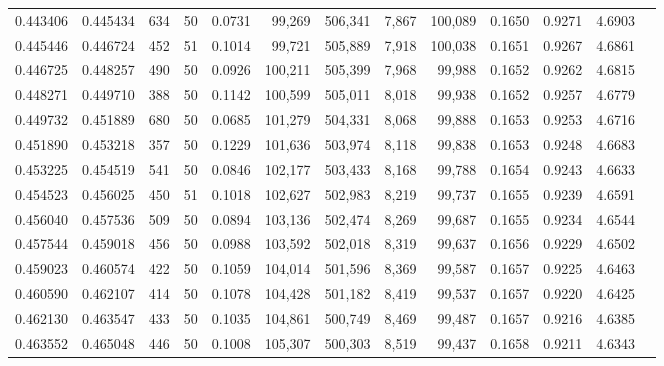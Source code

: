 \begin{tabular}{rrrrrrrrrrrrr}
0.443406 & 0.445434 &   634 &  50 &                                     0.0731 &  99,269 & 506,341 &   7,867 & 100,089 & 0.1650 & 0.9271 & 4.6903 \\
0.445446 & 0.446724 &   452 &  51 &                                     0.1014 &  99,721 & 505,889 &   7,918 & 100,038 & 0.1651 & 0.9267 & 4.6861 \\
0.446725 & 0.448257 &   490 &  50 &                                     0.0926 & 100,211 & 505,399 &   7,968 &  99,988 & 0.1652 & 0.9262 & 4.6815 \\
0.448271 & 0.449710 &   388 &  50 &                                     0.1142 & 100,599 & 505,011 &   8,018 &  99,938 & 0.1652 & 0.9257 & 4.6779 \\
0.449732 & 0.451889 &   680 &  50 &                                     0.0685 & 101,279 & 504,331 &   8,068 &  99,888 & 0.1653 & 0.9253 & 4.6716 \\
0.451890 & 0.453218 &   357 &  50 &                                     0.1229 & 101,636 & 503,974 &   8,118 &  99,838 & 0.1653 & 0.9248 & 4.6683 \\
0.453225 & 0.454519 &   541 &  50 &                                     0.0846 & 102,177 & 503,433 &   8,168 &  99,788 & 0.1654 & 0.9243 & 4.6633 \\
0.454523 & 0.456025 &   450 &  51 &                                     0.1018 & 102,627 & 502,983 &   8,219 &  99,737 & 0.1655 & 0.9239 & 4.6591 \\
0.456040 & 0.457536 &   509 &  50 &                                     0.0894 & 103,136 & 502,474 &   8,269 &  99,687 & 0.1655 & 0.9234 & 4.6544 \\
0.457544 & 0.459018 &   456 &  50 &                                     0.0988 & 103,592 & 502,018 &   8,319 &  99,637 & 0.1656 & 0.9229 & 4.6502 \\
0.459023 & 0.460574 &   422 &  50 &                                     0.1059 & 104,014 & 501,596 &   8,369 &  99,587 & 0.1657 & 0.9225 & 4.6463 \\
0.460590 & 0.462107 &   414 &  50 &                                     0.1078 & 104,428 & 501,182 &   8,419 &  99,537 & 0.1657 & 0.9220 & 4.6425 \\
0.462130 & 0.463547 &   433 &  50 &                                     0.1035 & 104,861 & 500,749 &   8,469 &  99,487 & 0.1657 & 0.9216 & 4.6385 \\
0.463552 & 0.465048 &   446 &  50 &                                     0.1008 & 105,307 & 500,303 &   8,519 &  99,437 & 0.1658 & 0.9211 & 4.6343 \\

\end{tabular}
